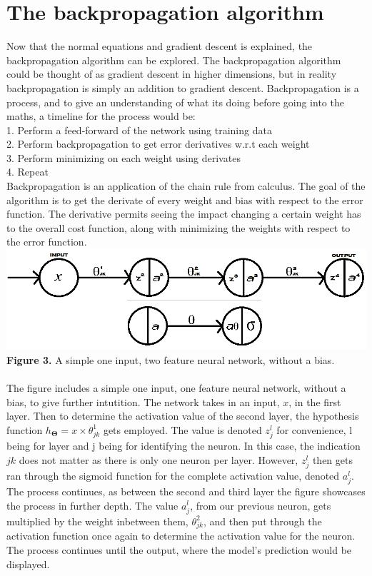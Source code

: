 \documentclass[a4paper,12pt]{article}
\begin{document}
\section{The backpropagation algorithm}
Now that the normal equations and gradient descent is explained, the backpropagation algorithm can be explored. The backpropagation algorithm could be thought of as gradient descent in higher dimensions, but in reality backpropagation is simply an addition to gradient descent. Backpropagation is a process, and to give an understanding of what its doing before going into the maths, a timeline for the process would be: 
\\ 1. Perform a feed-forward of the network using training data
\\ 2. Perform backpropagation to get error derivatives w.r.t each weight
\\ 3. Perform minimizing on each weight using derivates
\\ 4. Repeat
\\
Backpropagation is an application of the chain rule from calculus. The goal of the algorithm is to get the derivate of every weight and bias with respect to the error function. The derivative permits seeing the impact changing a certain weight has to the overall cost function, along with minimizing the weights with respect to the error function\cite{backpropagation}. 
\\
\includegraphics[scale=0.548]{onedimension}
\textbf{Figure 3.} A simple one input, two feature neural network, without a bias. \\ \\
The figure includes a simple one input, one feature neural network, without a bias, to give further intutition. The network takes in an input, $x$, in the first layer. Then to determine the activation value of the second layer, the hypothesis function $h_{\boldsymbol{\Theta}} = x \times \theta_{jk}^1$ gets employed. The value is denoted $z^l_j$ for convenience, l being for layer and j being for identifying the neuron. In this case, the indication $jk$ does not matter as there is only one neuron per layer. However, $z^l_j$ then gets ran through the sigmoid function for the complete activation value, denoted $a^l_j$. The process continues, as between the second and third layer the figure showcases the process in further depth. The value $a^l_j$, from our previous neuron, gets multiplied by the weight inbetween them, $\theta_{jk}^2$, and then put through the activation function once again to determine the activation value for the neuron. The process continues until the output, where the model's prediction would be displayed. 
\end{document}
